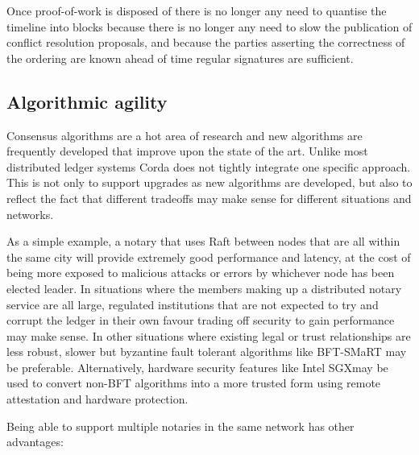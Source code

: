\documentclass{article}
\begin{document}
Once proof-of-work is disposed of there is no longer any need to quantise the timeline into blocks because there is
no longer any need to slow the publication of conflict resolution proposals, and because the parties asserting the
correctness of the ordering are known ahead of time regular signatures are sufficient.

\subsection{Algorithmic agility}

Consensus algorithms are a hot area of research and new algorithms are frequently developed that improve upon the
state of the art. Unlike most distributed ledger systems Corda does not tightly integrate one specific approach.
This is not only to support upgrades as new algorithms are developed, but also to reflect the fact that different
tradeoffs may make sense for different situations and networks.

As a simple example, a notary that uses Raft between nodes that are all within the same city will provide extremely
good performance and latency, at the cost of being more exposed to malicious attacks or errors by whichever node
has been elected leader. In situations where the members making up a distributed notary service are all large,
regulated institutions that are not expected to try and corrupt the ledger in their own favour trading off security
to gain performance may make sense. In other situations where existing legal or trust relationships are less
robust, slower but byzantine fault tolerant algorithms like BFT-SMaRT\cite{Bessani:2014:SMR:2671853.2672428} may be
preferable. Alternatively, hardware security features like Intel SGX\textregistered may be used to convert non-BFT
algorithms into a more trusted form using remote attestation and hardware protection.

Being able to support multiple notaries in the same network has other advantages:
\end{document}
